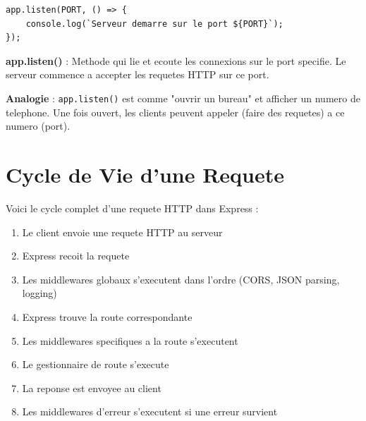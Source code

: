 \documentclass[a4paper,12pt]{book}
\begin{document}
\begin{lstlisting}[style=javascript]
app.listen(PORT, () => {
    console.log(`Serveur demarre sur le port ${PORT}`);
});
\end{lstlisting}

\begin{definitionbox}
    \textbf{app.listen()} : Methode qui lie et ecoute les connexions sur le port specifie. Le serveur commence a accepter les requetes HTTP sur ce port.
\end{definitionbox}

\begin{analogybox}
    \textbf{Analogie} : \texttt{app.listen()} est comme "ouvrir un bureau" et afficher un numero de telephone. Une fois ouvert, les clients peuvent appeler (faire des requetes) a ce numero (port).
\end{analogybox}

\section{Cycle de Vie d'une Requete}

Voici le cycle complet d'une requete HTTP dans Express :

\begin{enumerate}
    \item Le client envoie une requete HTTP au serveur
    \item Express recoit la requete
    \item Les middlewares globaux s'executent dans l'ordre (CORS, JSON parsing, logging)
    \item Express trouve la route correspondante
    \item Les middlewares specifiques a la route s'executent
    \item Le gestionnaire de route s'execute
    \item La reponse est envoyee au client
    \item Les middlewares d'erreur s'executent si une erreur survient
\end{enumerate}

\begin{center}
\end{center}
\end{document}
